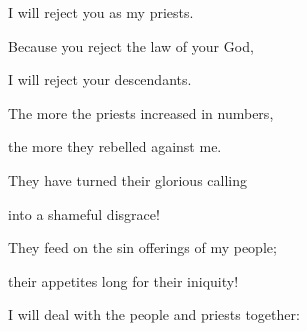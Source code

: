 {\par }{\Q I
will reject
you as my priests.
\par }{\Q Because
you reject
the law
of your God,
\par }{\Q I
will reject
your descendants.
\par }{\Q {}The more
the priests increased
in numbers,
\par }{\Q the more they rebelled
against
me.
\par }{\Q They
have turned their glorious calling
\par }{\Q into
a shameful
disgrace!
\par }{\Q {}They feed
on
the sin offerings
of my people;
\par }{\Q their appetites
long for their iniquity!
\par }{\Q {}I will deal with the people
and priests
together:

}
